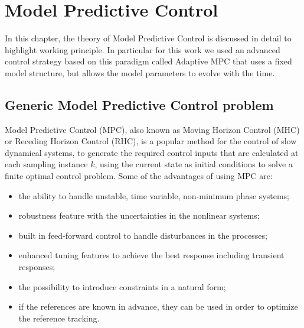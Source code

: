 \chapter{Model Predictive Control}

In this chapter, the theory of Model Predictive Control is discussed in detail to highlight working principle. In particular for this work we used an advanced control strategy based on this paradigm called Adaptive MPC that uses a fixed model structure, but allows the model parameters to evolve with the time.

\section{Generic Model Predictive Control problem}
Model Predictive Control (MPC), also known as Moving Horizon Control (MHC) or Receding Horizon Control (RHC), is a popular method for the control of slow dynamical systems, to generate the required
control inputs that are calculated at each sampling instance $k$, using the current state as initial
conditions to solve a finite optimal control problem. Some of the advantages of using MPC are:
\begin{itemize}
\item the ability to handle unstable, time variable, non-minimum phase systems;
\item robustness feature with the uncertainties in the nonlinear systems;
\item built in feed-forward control to handle disturbances in the processes;
\item enhanced tuning features to achieve the best response including transient responses;
\item the possibility to introduce constraints in a natural form;
\item if the references are known in advance, they can be used in order to optimize the reference tracking.
\end{itemize}


